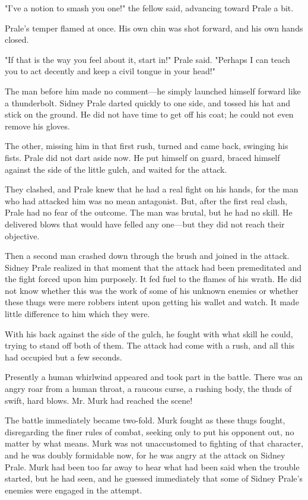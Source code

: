 \documentclass{novel}
\begin{document}
"I've a notion to smash you one!" the fellow said, advancing toward Prale a bit.

Prale's temper flamed at once. His own chin was shot forward, and his own hands closed.

"If that is the way you feel about it, start in!" Prale said. "Perhaps I can teach you to act decently and keep a civil tongue in your head!"

The man before him made no comment---he simply launched himself forward like a thunderbolt. Sidney Prale darted quickly to one side, and tossed his hat and stick on the ground. He did not have time to get off his coat; he could not even remove his gloves.

The other, missing him in that first rush, turned and came back, swinging his fists. Prale did not dart aside now. He put himself on guard, braced himself against the side of the little gulch, and waited for the attack.

They clashed, and Prale knew that he had a real fight on his hands, for the man who had attacked him was no mean antagonist. But, after the first real clash, Prale had no fear of the outcome. The man was brutal, but he had no skill. He delivered blows that would have felled any one---but they did not reach their objective.

Then a second man crashed down through the brush and joined in the attack. Sidney Prale realized in that moment that the attack had been premeditated and the fight forced upon him purposely. It fed fuel to the flames of his wrath. He did not know whether this was the work of some of his unknown enemies or whether these thugs were mere robbers intent upon getting his wallet and watch. It made little difference to him which they were.

With his back against the side of the gulch, he fought with what skill he could, trying to stand off both of them. The attack had come with a rush, and all this had occupied but a few seconds.

Presently a human whirlwind appeared and took part in the battle. There was an angry roar from a human throat, a raucous curse, a rushing body, the thuds of swift, hard blows. Mr. Murk had reached the scene!

The battle immediately became two-fold. Murk fought as these thugs fought, disregarding the finer rules of combat, seeking only to put his opponent out, no matter by what means. Murk was not unaccustomed to fighting of that character, and he was doubly formidable now, for he was angry at the attack on Sidney Prale. Murk had been too far away to hear what had been said when the trouble started, but he had seen, and he guessed immediately that some of Sidney Prale's enemies were engaged in the attempt.
\end{document}
